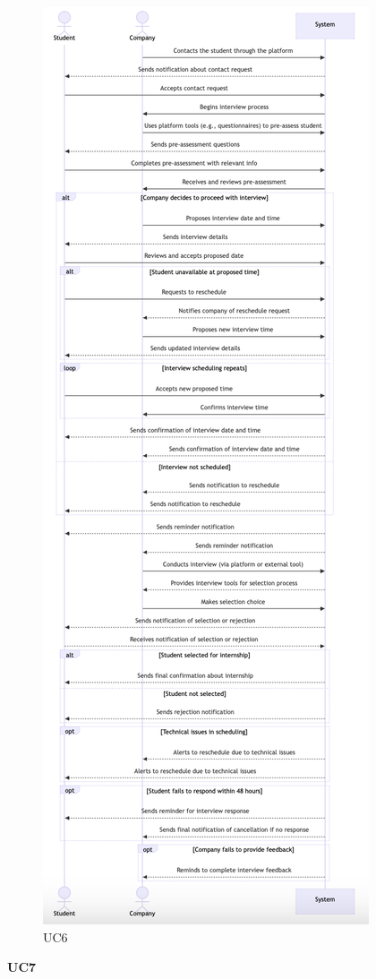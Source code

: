 \begin{figure}[H]
    \centering
    \includegraphics[width=0.5\linewidth]{RASD//Images/UC6.png}
    \caption{UC6}
\end{figure}
\pagebreak
\textbf{UC7}

